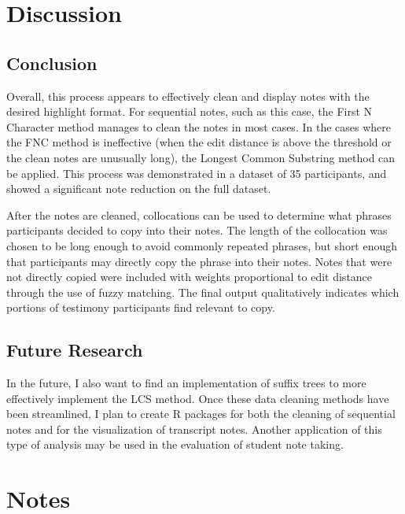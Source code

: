 \documentclass[print]{nuthesis}
\begin{document}
\hypertarget{discussion-1}{%
\section{Discussion}\label{discussion-1}}

\hypertarget{conclusion-1}{%
\subsection{Conclusion}\label{conclusion-1}}

Overall, this process appears to effectively clean and display notes with the desired highlight format.
For sequential notes, such as this case, the First N Character method manages to clean the notes in most cases.
In the cases where the FNC method is ineffective (when the edit distance is above the threshold or the clean notes are unusually long), the Longest Common Substring method can be applied.
This process was demonstrated in a dataset of 35 participants, and showed a significant note reduction on the full dataset.

After the notes are cleaned, collocations can be used to determine what phrases participants decided to copy into their notes.
The length of the collocation was chosen to be long enough to avoid commonly repeated phrases, but short enough that participants may directly copy the phrase into their notes.
Notes that were not directly copied were included with weights proportional to edit distance through the use of fuzzy matching.
The final output qualitatively indicates which portions of testimony participants find relevant to copy.

\hypertarget{future-research-1}{%
\subsection{Future Research}\label{future-research-1}}

In the future, I also want to find an implementation of suffix trees to more effectively implement the LCS method.
Once these data cleaning methods have been streamlined, I plan to create R packages for both the cleaning of sequential notes and for the visualization of transcript notes.
Another application of this type of analysis may be used in the evaluation of student note taking.

\hypertarget{notes}{%
\section{Notes}\label{notes}}
\end{document}

